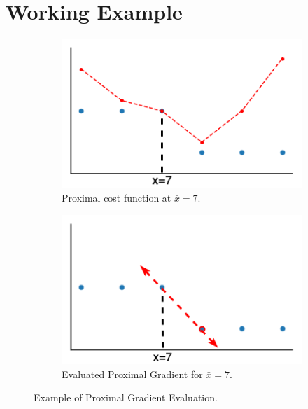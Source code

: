 \section{Working Example}

\begin{figure}
  \centering
  \begin{subfigure}[b]{0.48\columnwidth}
    \includegraphics[width=\linewidth]{figs/sosp-working_ex3}
    \caption{\label{fig:working_ex1}Proximal cost function at $\bar{x} = 7$.}
  \end{subfigure}
  \hspace{0.1cm}
  \begin{subfigure}[b]{0.48\columnwidth}
    \includegraphics[width=\linewidth]{figs/sosp-working_ex2}
    \caption{\label{fig:working_ex2}Evaluated Proximal Gradient for $\bar{x} = 7$.}
  \end{subfigure}
  \vspace{-15pt}
  \caption{\label{fig:working_ex}Example of Proximal Gradient Evaluation.}
  \vspace{-15pt}
\end{figure}

